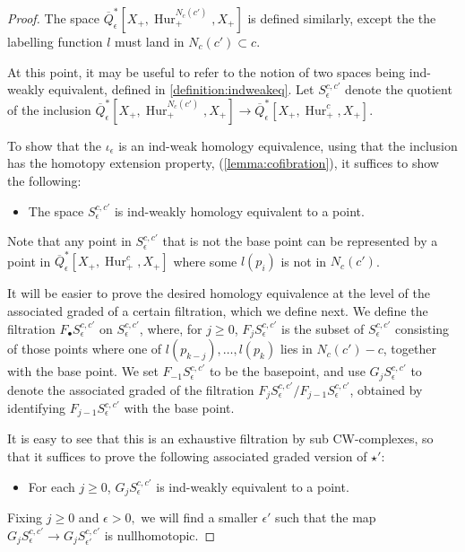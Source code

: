 \documentclass[12 pt]{amsart}
\theoremstyle{plain}
\theoremstyle{definition}
\theoremstyle{remark}
\numberwithin{equation}{section}
\DeclareMathOperator\Hur{Hur}
\begin{document}
\begin{proof}
		The space $\overline{Q}^*_{\epsilon}[X_+,\Hur^{N_c(c')}_+,X_+]$ is
		defined similarly, except the the labelling function $l$ must
		land in $N_c(c')\subset c$.


	At this point, it may be useful to refer to the notion of two spaces being
	ind-weakly equivalent, defined in 
\autoref{definition:indweakeq}.
			Let $S^{c,c'}_{\epsilon}$ denote the quotient of the inclusion $\overline{Q}^*_{\epsilon}[X_+,\Hur^{N_c(c')}_+,X_+]\to  \overline{Q}^*_{\epsilon}[X_+,\Hur^{c}_+,X_+]$.
			
			
	To show that the
	$\iota_{\epsilon}$ is an ind-weak homology equivalence, using that the
	inclusion has the homotopy extension property,  (\autoref{lemma:cofibration}), it suffices to show the
	following:
	\begin{itemize}
		\item[$\star'$] 
			The space $S^{c,c'}_{\epsilon}$ is ind-weakly homology equivalent to a point.
	\end{itemize}

Note that any point in $S^{c,c'}_{\epsilon}$ that is not the base point can be represented by a point in $\overline{Q}^*_{\epsilon}[X_+,\Hur^{c}_+,X_+]$ where some $l(p_i)$ is not in $N_c(c')$.

It will be easier to prove the desired homology equivalence at the level of the
associated graded of a certain filtration, which we define next.
We define the filtration $F_\bullet S^{c,c'}_{\epsilon}$ on
$S^{c,c'}_{\epsilon}$,
where, for $j \geq 0$, $F_j S^{c,c'}_{\epsilon}$ 
is the subset of $S^{c,c'}_{\epsilon}$
consisting of those points where one of $l(p_{k-j}), \ldots, l(p_k)$ lies in
$N_c(c') - c$, together with the base point.
We set $F_{-1}S^{c,c'}_{\epsilon}$ to be the basepoint, and use $G_j S^{c,c'}_{\epsilon}$ to denote the associated graded of the filtration $F_j S^{c,c'}_{\epsilon}/ F_{j-1} S^{c,c'}_{\epsilon}$, obtained by identifying $F_{j-1} S^{c,c'}_{\epsilon}$ with the base point.


 It is easy to see that this is an exhaustive filtration by sub CW-complexes, so
 that it suffices to prove the following associated graded version of $\star'$:

\begin{itemize}
	\item[$\star$] For each $j\geq0$, $G_jS^{c,c'}_{\epsilon}$ is ind-weakly equivalent to a point.
\end{itemize}

	
	Fixing $j\geq0$ and $\epsilon>0,$ %
we will find a smaller $\epsilon'$ such that the map
$G_jS^{c,c'}_{\epsilon} \to G_jS^{c,c'}_{\epsilon'}$ is nullhomotopic.


\end{proof}
\end{document}
